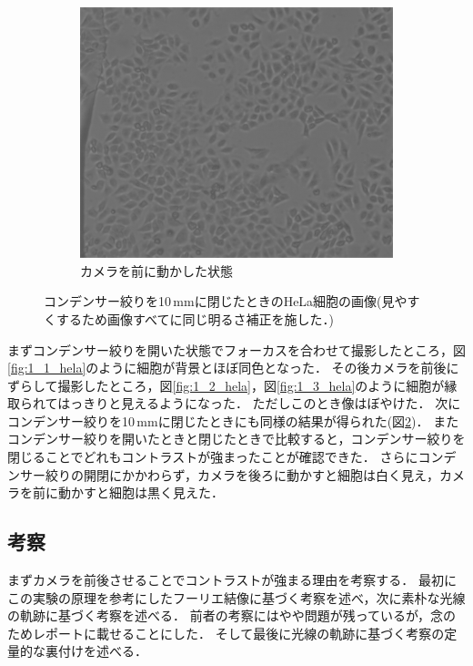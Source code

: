 \documentclass[titlepage]{jsarticle}
\begin{document}
\begin{figure}[htbp]
    \begin{subfigure}{0.3\columnwidth}
        \includegraphics[width=\columnwidth]{2_3_10mm_hela_forward_edit.png}
        \caption{カメラを前に動かした状態}
        \label{fig:2_3_hela}
    \end{subfigure}
    \caption{コンデンサー絞りを10\,mmに閉じたときのHeLa細胞の画像(見やすくするため画像すべてに同じ明るさ補正を施した．)}
    \label{fig:2_hela}
\end{figure}

まずコンデンサー絞りを開いた状態でフォーカスを合わせて撮影したところ，図\ref{fig:1_1_hela}のように細胞が背景とほぼ同色となった．
その後カメラを前後にずらして撮影したところ，図\ref{fig:1_2_hela}，図\ref{fig:1_3_hela}のように細胞が縁取られてはっきりと見えるようになった．
ただしこのとき像はぼやけた．
次にコンデンサー絞りを10\,mmに閉じたときにも同様の結果が得られた(図\ref{fig:2_hela})．
またコンデンサー絞りを開いたときと閉じたときで比較すると，コンデンサー絞りを閉じることでどれもコントラストが強まったことが確認できた．
さらにコンデンサー絞りの開閉にかかわらず，カメラを後ろに動かすと細胞は白く見え，カメラを前に動かすと細胞は黒く見えた．

\subsection{考察}

まずカメラを前後させることでコントラストが強まる理由を考察する．
最初にこの実験の原理を参考にしたフーリエ結像に基づく考察を述べ，次に素朴な光線の軌跡に基づく考察を述べる．
前者の考察にはやや問題が残っているが，念のためレポートに載せることにした．
そして最後に光線の軌跡に基づく考察の定量的な裏付けを述べる．
\end{document}
